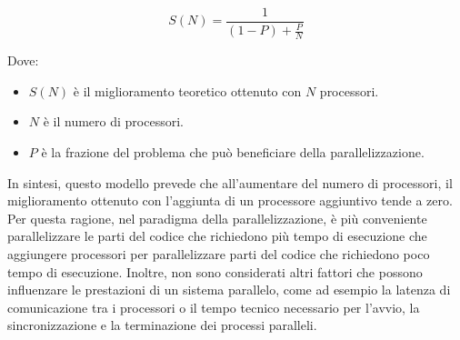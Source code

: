 \begin{equation}
  S(N) = \frac{1}{(1 - P) + \frac{P}{N}}
\end{equation}

Dove:
\begin{itemize}
  \item $S(N)$ è il miglioramento teoretico ottenuto con $N$ processori.

  \item $N$ è il numero di processori.

  \item $P$ è la frazione del problema che può beneficiare della parallelizzazione.
\end{itemize}

In sintesi, questo modello prevede che all'aumentare del numero di processori,
il miglioramento ottenuto con l'aggiunta di un processore aggiuntivo tende a
zero. Per questa ragione, nel paradigma della parallelizzazione, è più conveniente
parallelizzare le parti del codice che richiedono più tempo di esecuzione che aggiungere
processori per parallelizzare parti del codice che richiedono poco tempo di esecuzione.
Inoltre, non sono considerati altri fattori che possono influenzare le prestazioni
di un sistema parallelo, come ad esempio la latenza di comunicazione tra i
processori o il tempo tecnico necessario per l'avvio, la sincronizzazione e la terminazione
dei processi paralleli.